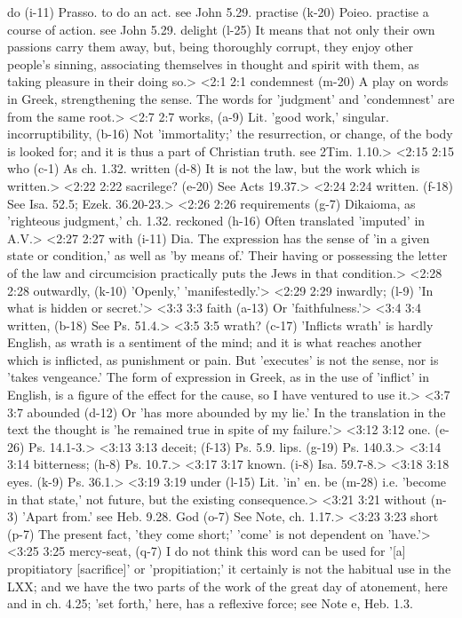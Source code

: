   do (i-11)  Prasso. to do an act. see John 5.29.
  practise (k-20)  Poieo. practise a course of action. see John 5.29.
  delight (l-25)  It means that not only their own passions carry them away,  but, being thoroughly corrupt, they enjoy other people's  sinning, associating themselves in thought and spirit with  them, as taking pleasure in their doing so.>
<2:1 2:1  condemnest (m-20)  A play on words in Greek, strengthening the sense. The words  for 'judgment' and 'condemnest' are from the same root.>
<2:7 2:7  works, (a-9)  Lit. 'good work,' singular.
  incorruptibility, (b-16)  Not 'immortality;' the resurrection, or change, of the body  is looked for; and it is thus a part of Christian truth. see 2Tim. 1.10.>
<2:15 2:15  who (c-1)  As ch. 1.32.
  written (d-8)  It is not the law, but the work which is written.>
<2:22 2:22  sacrilege? (e-20)  See Acts 19.37.>
<2:24 2:24  written. (f-18)  See Isa. 52.5; Ezek. 36.20-23.>
<2:26 2:26  requirements (g-7)  Dikaioma, as 'righteous judgment,' ch. 1.32.
  reckoned (h-16)  Often translated 'imputed' in A.V.>
<2:27 2:27  with (i-11)  Dia. The expression has the sense of 'in a given state or  condition,' as well as 'by means of.' Their having or  possessing the letter of the law and circumcision practically  puts the Jews in that condition.>
<2:28 2:28  outwardly, (k-10)  'Openly,' 'manifestedly.'>
<2:29 2:29  inwardly; (l-9)  'In what is hidden or secret.'>
<3:3 3:3  faith (a-13)  Or 'faithfulness.'>
<3:4 3:4  written, (b-18)  See Ps. 51.4.>
<3:5 3:5  wrath? (c-17)  'Inflicts wrath' is hardly English, as wrath is a sentiment  of the mind; and it is what reaches another which is inflicted,  as punishment or pain. But 'executes' is not the sense, nor is  'takes vengeance.' The form of expression in Greek, as in the  use of 'inflict' in English, is a figure of the effect for the  cause, so I have ventured to use it.>
<3:7 3:7  abounded (d-12)  Or 'has more abounded by my lie.' In the translation in the  text the thought is 'he remained true in spite of my failure.'>
<3:12 3:12  one. (e-26)  Ps. 14.1-3.>
<3:13 3:13  deceit; (f-13)  Ps. 5.9.
  lips. (g-19)  Ps. 140.3.>
<3:14 3:14  bitterness; (h-8)  Ps. 10.7.>
<3:17 3:17  known. (i-8)  Isa. 59.7-8.>
<3:18 3:18  eyes. (k-9)  Ps. 36.1.>
<3:19 3:19  under (l-15)  Lit. 'in' en.
  be (m-28)  i.e. 'become in that state,' not future, but the existing  consequence.>
<3:21 3:21  without (n-3)  'Apart from.' see Heb. 9.28.
  God (o-7)  See Note, ch. 1.17.>
<3:23 3:23  short (p-7)  The present fact, 'they come short;' 'come' is not dependent  on 'have.'>
<3:25 3:25  mercy-seat, (q-7)  I do not think this word can be used for '[a] propitiatory  [sacrifice]' or 'propitiation;' it certainly is not the  habitual use in the LXX; and we have the two parts of the work  of the great day of atonement, here and in ch. 4.25; 'set  forth,' here, has a reflexive force; see Note e, Heb. 1.3.
